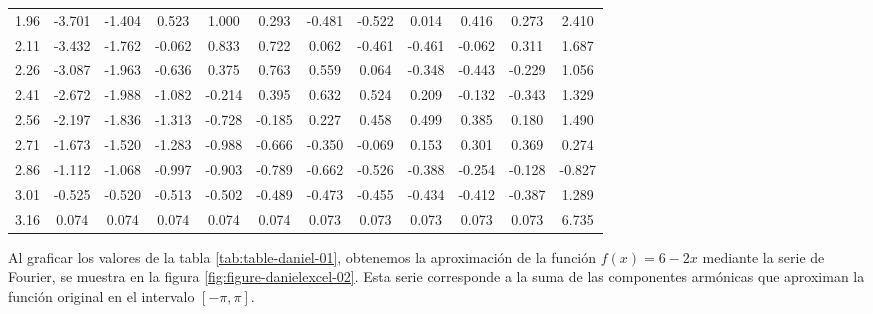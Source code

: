 {\begin{table}[H]
\begin{center}
{\begin{tabular}{|c|cccccccccc|c|}
1.96
& -3.701 & -1.404 & 0.523 & 1.000 & 0.293 & -0.481 & -0.522 & 0.014 & 0.416 & 0.273 & 2.410 \\
2.11
& -3.432 & -1.762 & -0.062 & 0.833 & 0.722 & 0.062 & -0.461 & -0.461 & -0.062 & 0.311 & 1.687 \\
2.26
& -3.087 & -1.963 & -0.636 & 0.375 & 0.763 & 0.559 & 0.064 & -0.348 & -0.443 & -0.229 & 1.056 \\
2.41
& -2.672 & -1.988 & -1.082 & -0.214 & 0.395 & 0.632 & 0.524 & 0.209 & -0.132 & -0.343 & 1.329 \\
2.56
& -2.197 & -1.836 & -1.313 & -0.728 & -0.185 & 0.227 & 0.458 & 0.499 & 0.385 & 0.180 & 1.490 \\
2.71
& -1.673 & -1.520 & -1.283 & -0.988 & -0.666 & -0.350 & -0.069 & 0.153 & 0.301 & 0.369 & 0.274 \\
2.86
& -1.112 & -1.068 & -0.997 & -0.903 & -0.789 & -0.662 & -0.526 & -0.388 & -0.254 & -0.128 & -0.827 \\
3.01
& -0.525 & -0.520 & -0.513 & -0.502 & -0.489 & -0.473 & -0.455 & -0.434 & -0.412 & -0.387 & 1.289 \\
3.16
& 0.074 & 0.074 & 0.074 & 0.074 & 0.074 & 0.073 & 0.073 & 0.073 & 0.073 & 0.073 & 6.735 \\
\hline
\end{tabular}
}
\end{center}
\end{table}

\newpage
\begin{minipage}{\textwidth}
    Al graficar los valores de la tabla \ref{tab:table-daniel-01}, obtenemos la aproximación de la función \(f(x)=6-2x\) mediante la serie de Fourier, se muestra en la figura \ref{fig:figure-danielexcel-02}. Esta serie corresponde a la suma de las componentes armónicas que aproximan la función original en el intervalo \([-\pi,\pi]\).
    

\end{minipage}}
